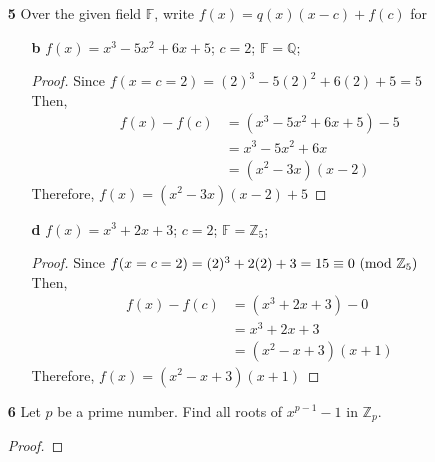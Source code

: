 \documentclass[paper=usletter, fontsize=12pt]{article}
\begin{document}
\begin{itemize}
\begin{enumerate}
\begin{enumerate}
\begin{proof}
                \end{proof}

            \end{enumerate}

            \item[\textbf{5}] Over the given field $\mathbb{F}$, write
            $f(x)=q(x)(x-c)+f(c)$ for
            \begin{enumerate}

                \item[\textbf{b}] $f(x)=x^3-5x^2+6x+5$; $c=2$;
                $\mathbb{F}=\mathbb{Q}$;
                \begin{proof}

                    Since $f(x=c=2)=(2)^3-5(2)^2+6(2)+5=5$\\
                    Then,
                    \begin{align*}
                        f(x)-f(c) & = (x^3-5x^2+6x+5)-5\\
                        & = x^3-5x^2+6x\\
                        & = (x^2-3x)(x-2)
                    \end{align*}
                    Therefore, $f(x)=(x^2-3x)(x-2)+5$ \qedhere

                \end{proof}

                \item[\textbf{d}] $f(x)=x^3+2x+3$; $c=2$;
                $\mathbb{F}=\mathbb{Z}_5$;
                \begin{proof}

                    Since $f(x=c=2)=(2)^3+2(2)+3=15 \equiv 0
                    \ (\mathrm{mod}\ \mathbb{Z}_5)$\\
                    Then,
                    \begin{align*}
                        f(x)-f(c) & = (x^3+2x+3)-0\\
                        & = x^3+2x+3\\
                        & = (x^2-x+3)(x+1)
                    \end{align*}
                    Therefore, $f(x)=(x^2-x+3)(x+1)$ \qedhere

                \end{proof}

            \end{enumerate}

            \item[\textbf{6}] Let $p$ be a prime number. Find all roots of
            $x^{p-1}-1$ in $\mathbb{Z}_p$.
            \begin{proof}


\end{proof}
\end{enumerate}
\end{itemize}
\end{document}
